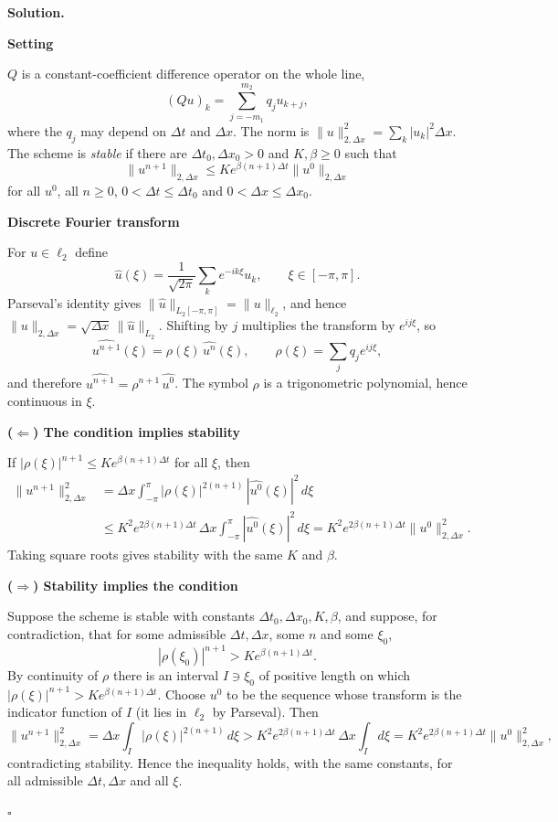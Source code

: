 \documentclass[11pt,a4paper]{article}
\newenvironment{solution}
  {\par\noindent\textbf{Solution.}\par\nobreak}
  {\par\hfill\(\square\)\par}
\newcommand{\step}[1]{\par\addvspace{0.5em}\noindent\textbf{#1}\par\nobreak}
\newcommand{\norm}[1]{\lVert#1\rVert}
\begin{document}
\begin{solution}
\step{Setting}
\(Q\) is a constant-coefficient difference operator on the whole line,
\[
  (Qu)_k=\sum_{j=-m_1}^{m_2}q_ju_{k+j},
\]
where the \(q_j\) may depend on \(\Delta t\) and \(\Delta x\).  The norm
is \(\norm{u}_{2,\Delta x}^2=\sum_k|u_k|^2\Delta x\).  The scheme is
\emph{stable} if there are \(\Delta t_0,\Delta x_0>0\) and
\(K,\beta\ge0\) such that
\[
  \norm{u^{n+1}}_{2,\Delta x}\le Ke^{\beta(n+1)\Delta t}\norm{u^0}_{2,\Delta x}
\]
for all \(u^0\), all \(n\ge0\), \(0<\Delta t\le\Delta t_0\) and
\(0<\Delta x\le\Delta x_0\).

\step{Discrete Fourier transform}
For \(u\in\ell_2\) define
\[
  \hat u(\xi)=\frac1{\sqrt{2\pi}}\sum_k e^{-ik\xi}u_k,\qquad \xi\in[-\pi,\pi].
\]
Parseval's identity gives \(\norm{\hat u}_{L_2[-\pi,\pi]}=\norm{u}_{\ell_2}\),
and hence \(\norm{u}_{2,\Delta x}=\sqrt{\Delta x}\,\norm{\hat u}_{L_2}\).
Shifting by \(j\) multiplies the transform by \(e^{ij\xi}\), so
\[
  \widehat{u^{n+1}}(\xi)=\rho(\xi)\,\widehat{u^n}(\xi),
  \qquad
  \rho(\xi)=\sum_jq_je^{ij\xi},
\]
and therefore \(\widehat{u^{n+1}}=\rho^{n+1}\,\widehat{u^0}\).  The
symbol \(\rho\) is a trigonometric polynomial, hence continuous in
\(\xi\).

\step{(\(\Leftarrow\)) The condition implies stability}
If \(|\rho(\xi)|^{n+1}\le Ke^{\beta(n+1)\Delta t}\) for all \(\xi\), then
\begin{align*}
  \norm{u^{n+1}}_{2,\Delta x}^2
  &=\Delta x\int_{-\pi}^{\pi}|\rho(\xi)|^{2(n+1)}\,|\widehat{u^0}(\xi)|^2\,d\xi\\
  &\le K^2e^{2\beta(n+1)\Delta t}\,\Delta x\int_{-\pi}^{\pi}|\widehat{u^0}(\xi)|^2\,d\xi
   =K^2e^{2\beta(n+1)\Delta t}\norm{u^0}_{2,\Delta x}^2 .
\end{align*}
Taking square roots gives stability with the same \(K\) and \(\beta\).

\step{(\(\Rightarrow\)) Stability implies the condition}
Suppose the scheme is stable with constants \(\Delta t_0,\Delta x_0,K,\beta\),
and suppose, for contradiction, that for some admissible
\(\Delta t,\Delta x\), some \(n\) and some \(\xi_0\),
\[
  |\rho(\xi_0)|^{n+1}>Ke^{\beta(n+1)\Delta t}.
\]
By continuity of \(\rho\) there is an interval \(I\ni\xi_0\) of positive
length on which \(|\rho(\xi)|^{n+1}>Ke^{\beta(n+1)\Delta t}\).  Choose
\(u^0\) to be the sequence whose transform is the indicator function of
\(I\) (it lies in \(\ell_2\) by Parseval).  Then
\[
  \norm{u^{n+1}}_{2,\Delta x}^2
  =\Delta x\int_I|\rho(\xi)|^{2(n+1)}\,d\xi
  >K^2e^{2\beta(n+1)\Delta t}\,\Delta x\int_I d\xi
  =K^2e^{2\beta(n+1)\Delta t}\norm{u^0}_{2,\Delta x}^2,
\]
contradicting stability.  Hence the inequality holds, with the same
constants, for all admissible \(\Delta t,\Delta x\) and all \(\xi\).
\end{solution}
\end{document}
